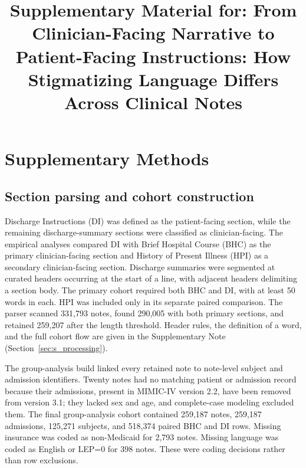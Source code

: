 \documentclass[unnumsec,webpdf,contemporary,large]{oup-authoring-template}
\begin{document}
\doublespacing
\renewcommand{\thetable}{S\arabic{table}}
\renewcommand{\thefigure}{S\arabic{figure}}


\title[Supplementary material]{Supplementary Material for: From Clinician-Facing Narrative to Patient-Facing Instructions: How Stigmatizing Language Differs Across Clinical Notes}
\maketitle
\onecolumn

\section{Supplementary Methods}

\subsection{Section parsing and cohort construction}

Discharge Instructions (DI) was defined as the patient-facing section, while the remaining discharge-summary sections were classified as clinician-facing. The empirical analyses compared DI with Brief Hospital Course (BHC) as the primary clinician-facing section and History of Present Illness (HPI) as a secondary clinician-facing section. Discharge summaries were segmented at curated headers occurring at the start of a line, with adjacent headers delimiting a section body. The primary cohort required both BHC and DI, with at least 50 words in each. HPI was included only in its separate paired comparison. The parser scanned 331,793 notes, found 290,005 with both primary sections, and retained 259,207 after the length threshold. Header rules, the definition of a word, and the full cohort flow are given in the Supplementary Note (Section~\ref{sec:s_processing}).

The group-analysis build linked every retained note to note-level subject and admission identifiers. Twenty notes had no matching patient or admission record because their admissions, present in MIMIC-IV version 2.2, have been removed from version 3.1; they lacked sex and age, and complete-case modeling excluded them. The final group-analysis cohort contained 259,187 notes, 259,187 admissions, 125,271 subjects, and 518,374 paired BHC and DI rows. Missing insurance was coded as non-Medicaid for 2,793 notes. Missing language was coded as English or LEP=0 for 398 notes. These were coding decisions rather than row exclusions.
\end{document}
